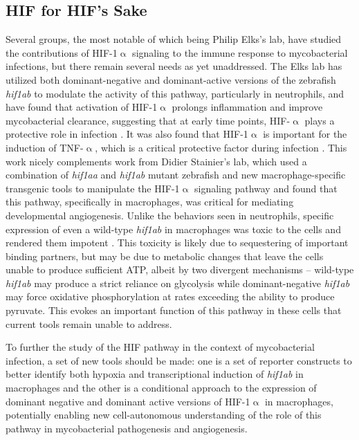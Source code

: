 \subsection{HIF for HIF's Sake}

Several groups, the most notable of which being Philip Elks's lab, have studied the contributions of HIF-1$\upalpha$ signaling to the immune response to mycobacterial infections, but there remain several needs as yet unaddressed. The Elks lab has utilized both dominant-negative and dominant-active versions of the zebrafish \textit{hif1ab} to modulate the activity of this pathway, particularly in neutrophils, and have found that activation of HIF-1$\upalpha$ prolongs inflammation and improve mycobacterial clearance, suggesting that at early time points, HIF-$\upalpha$ plays a protective role in infection \citep{Elks2011, Elks2013}. It was also found that HIF-1$\upalpha$ is important for the induction of TNF-$\upalpha$, which is a critical protective factor during infection \citep{Lewis2019, Flynn1995}. This work nicely complements work from Didier Stainier's lab, which used a combination of \textit{hif1aa} and \textit{hif1ab} mutant zebrafish and new macrophage-specific transgenic tools to manipulate the HIF-1$\upalpha$ signaling pathway and found that this pathway, specifically in macrophages, was critical for mediating developmental angiogenesis. Unlike the behaviors seen in neutrophils, specific expression of even a wild-type \textit{hif1ab} in macrophages was toxic to the cells and rendered them impotent \citep{Gerri2017}. This toxicity is likely due to sequestering of important binding partners, but may be due to metabolic changes that leave the cells unable to produce sufficient ATP, albeit by two divergent mechanisms -- wild-type \textit{hif1ab} may produce a strict reliance on glycolysis while dominant-negative \textit{hif1ab} may force oxidative phosphorylation at rates exceeding the ability to produce pyruvate. This evokes an important function of this pathway in these cells that current tools remain unable to address. 

To further the study of the HIF pathway in the context of mycobacterial infection, a set of new tools should be made: one is a set of reporter constructs to better identify both hypoxia and transcriptional induction of \textit{hif1ab} in macrophages and the other is a conditional approach to the expression of dominant negative and dominant active versions of HIF-1$\upalpha$ in macrophages, potentially enabling new cell-autonomous understanding of the role of this pathway in mycobacterial pathogenesis and angiogenesis.


